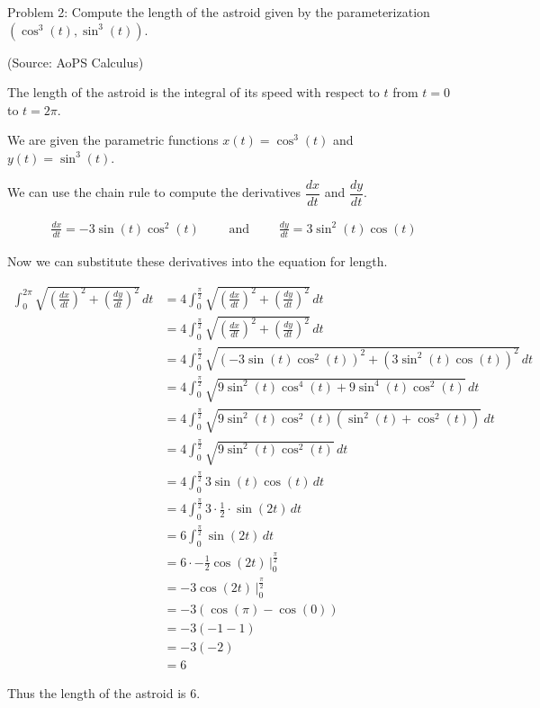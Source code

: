 Problem 2: Compute the length of the astroid given by the parameterization $(\cos^3(t), \sin^3(t))$.

(Source: AoPS Calculus)

The length of the astroid is the integral of its speed with respect to $t$ from $t = 0$ to $t = 2\pi$.

We are given the parametric functions $x(t) = \cos^3(t)$ and $y(t) = \sin^3(t)$.

We can use the chain rule to compute the derivatives $\dfrac{dx}{dt}$ and $\dfrac{dy}{dt}$.

\begin{align*}
\frac{dx}{dt} = -3 \sin(t) \cos^2(t) \qquad \text{ and } \qquad \frac{dy}{dt} = 3 \sin^2(t) \cos(t)
\end{align*}

Now we can substitute these derivatives into the equation for length.

\begin{align*}
\int_{0}^{2\pi} \sqrt{\left(\frac{dx}{dt}\right)^2 + \left(\frac{dy}{dt}\right)^2} \, dt &= 4 \int_{0}^{\frac{\pi}{2}} \sqrt{\left(\frac{dx}{dt}\right)^2 + \left(\frac{dy}{dt}\right)^2} \, dt \\
&= 4 \int_{0}^{\frac{\pi}{2}} \sqrt{\left(\frac{dx}{dt}\right)^2 + \left(\frac{dy}{dt}\right)^2} \, dt \\
&= 4 \int_{0}^{\frac{\pi}{2}} \sqrt{\left(-3 \sin(t) \cos^2(t)\right)^2 + \left(3 \sin^2(t) \cos(t)\right)^2} \, dt \\
&= 4 \int_{0}^{\frac{\pi}{2}} \sqrt{9 \sin^2(t) \cos^4(t) + 9 \sin^4(t) \cos^2(t)} \, dt \\
&= 4 \int_{0}^{\frac{\pi}{2}} \sqrt{9 \sin^2(t) \cos^2(t) (\sin^2(t) + \cos^2(t))} \, dt \\
&= 4 \int_{0}^{\frac{\pi}{2}} \sqrt{9 \sin^2(t) \cos^2(t)} \, dt \\
&= 4 \int_{0}^{\frac{\pi}{2}} 3 \sin(t) \cos(t) \, dt \\
&= 4 \int_{0}^{\frac{\pi}{2}} 3 \cdot \frac{1}{2} \cdot \sin(2t) \, dt \\
&= 6 \int_{0}^{\frac{\pi}{2}} \sin(2t) \, dt \\
&= 6 \cdot -\frac{1}{2} \cos(2t) \, \Bigg|_{0}^{\frac{\pi}{2}} \\
&= -3 \cos(2t) \, \Bigg|_{0}^{\frac{\pi}{2}} \\
&= -3 \left(\cos(\pi) - \cos(0)\right) \\
&= -3 (-1 - 1) \\
&= -3 (-2) \\
&= \boxed{6}
\end{align*}

Thus the length of the astroid is $\boxed{6}$.
